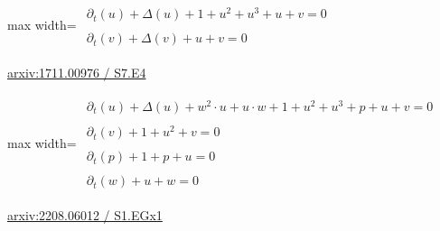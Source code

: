 \documentclass[UTF8,10pt,a4paper,fontset=mac]{ctexart}
\begin{document}
\begin{minipage}{\linewidth}\begin{center}\begin{adjustbox}{max width=\linewidth}$\displaystyle\begin{gathered}\begin{gathered}\partial_{t}(u)+\Delta(u)+1+u^{2}+u^{3}+u+v=0\end{gathered}\\[5pt]\begin{gathered}\partial_{t}(v)+\Delta(v)+u+v=0\end{gathered}\end{gathered}$\end{adjustbox}\end{center}{\small\href{https://arxiv.org/html/1711.00976#S7.E4}{arxiv:1711.00976 / S7.E4}}\par\end{minipage}\par\vspace{6mm}

\begin{minipage}{\linewidth}\begin{center}\begin{adjustbox}{max width=\linewidth}$\displaystyle\begin{gathered}\begin{gathered}\partial_{t}(u)+\Delta(u)+w^{2}\cdot u+u\cdot w+1+u^{2}+u^{3}+p+u+v=0\end{gathered}\\[5pt]\begin{gathered}\partial_{t}(v)+1+u^{2}+v=0\end{gathered}\\[5pt]\begin{gathered}\partial_{t}(p)+1+p+u=0\end{gathered}\\[5pt]\begin{gathered}\partial_{t}(w)+u+w=0\end{gathered}\end{gathered}$\end{adjustbox}\end{center}{\small\href{https://arxiv.org/html/2208.06012#S1.EGx1}{arxiv:2208.06012 / S1.EGx1}}\par\end{minipage}\par\vspace{6mm}
\end{document}
